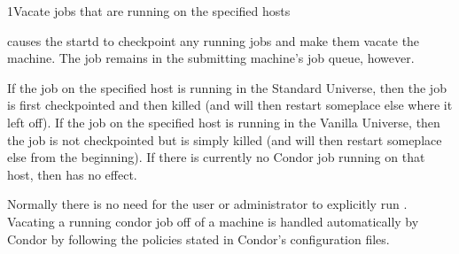 \begin{ManPage}{}{1}{Vacate jobs that are running on the specified hosts}
\label{man-condor-vacate}
\Synopsis {}

\Description
{} causes the startd to checkpoint any running jobs
and make them vacate the machine. The job remains in
the submitting machine's job queue, however. 

If the job on the specified host is running in the Standard Universe, then the job is first checkpointed and then killed (and will
then restart someplace else where it left off). If the job on the specified host is running in the Vanilla Universe, then the job is
not checkpointed but is simply killed (and will then restart someplace else from the beginning). If there is currently no
Condor job running on that host, then  has no effect. 

Normally there is no need for the user or administrator to explicitly run . Vacating a running condor job off of a
machine is handled automatically by Condor by following the policies stated in Condor's configuration files. 

\begin{Options}
\end{Options}

\end{ManPage}
